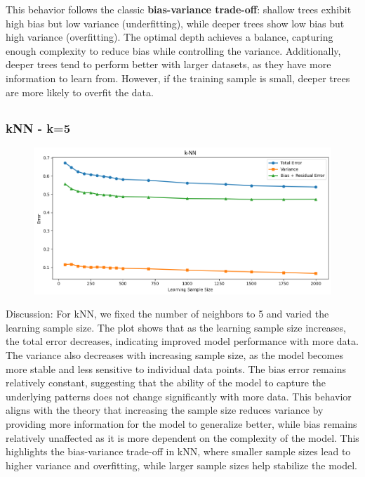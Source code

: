 \documentclass[a4paper,10pt]{article}
\begin{document}
This behavior follows the classic \textbf{bias-variance trade-off}: shallow trees exhibit high bias but low variance (underfitting), while deeper trees show low bias but high variance (overfitting). The optimal depth achieves a balance, capturing enough complexity to reduce bias while controlling the variance. Additionally, deeper trees tend to perform better with larger datasets, as they have more information to learn from. However, if the training sample is small, deeper trees are more likely to overfit the data.




    

\subsection{}

\subsubsection{kNN - k=5}

\begin{figure}[H]
    \centering
    \includegraphics[width=0.8\linewidth]{2.4_knn.png}
\end{figure}

Discussion:  
For kNN, we fixed the number of neighbors to 5 and varied the learning sample size. The plot shows that as the learning sample size increases, the total error decreases, indicating improved model performance with more data. The variance also decreases with increasing sample size, as the model becomes more stable and less sensitive to individual data points. The bias error remains relatively constant, suggesting that the ability of the model to capture the underlying patterns does not change significantly with more data. This behavior aligns with the theory that increasing the sample size reduces variance by providing more information for the model to generalize better, while bias remains relatively unaffected as it is more dependent on the complexity of the model. This highlights the bias-variance trade-off in kNN, where smaller sample sizes lead to higher variance and overfitting, while larger sample sizes help stabilize the model.
\end{document}

